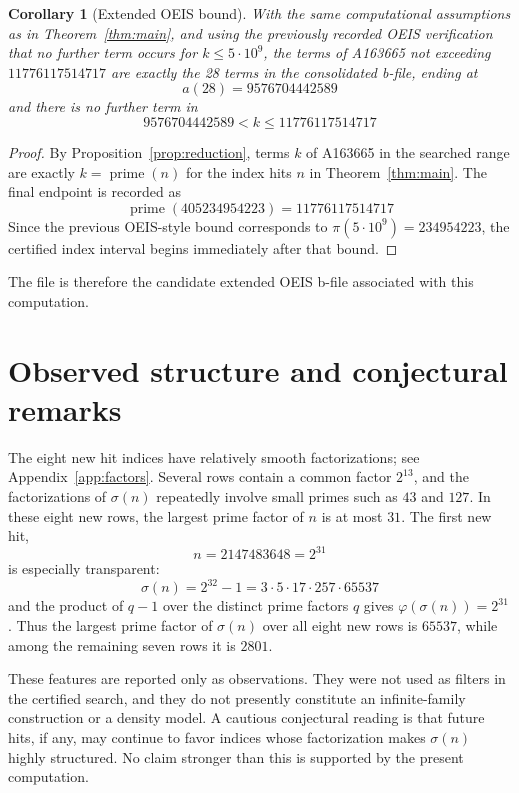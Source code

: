 \documentclass[11pt]{article}
\newtheorem{corollary}[theorem]{Corollary}
\theoremstyle{definition}
\theoremstyle{remark}
\newcommand{\seqid}{A163665}
\begin{document}
\begin{corollary}[Extended OEIS bound]
\label{cor:bound}
With the same computational assumptions as in Theorem~\ref{thm:main},
and using the previously recorded OEIS verification that no further term
occurs for \(k\leq 5\cdot 10^9\),
the terms of \seqid{} not exceeding \(11776117514717\) are exactly the
28 terms in the consolidated b-file, ending at
\[
  a(28)=9576704442589
\]
and there is no further term in
\[
  9576704442589 < k \leq 11776117514717
\]
\end{corollary}

\begin{proof}
By Proposition~\ref{prop:reduction}, terms \(k\) of \seqid{} in the
searched range are exactly \(k=\operatorname{prime}(n)\) for the index
hits \(n\) in Theorem~\ref{thm:main}.  The final endpoint is recorded as
\[
  \operatorname{prime}(405234954223)=11776117514717
\]
Since the previous OEIS-style bound corresponds to
\(\pi(5\cdot 10^9)=234954223\), the certified index interval begins
immediately after that bound.
\end{proof}

The file  is therefore the candidate extended
OEIS b-file associated with this computation.

\section{Observed structure and conjectural remarks}

The eight new hit indices have relatively smooth factorizations; see
Appendix~\ref{app:factors}.  Several rows contain a common factor
\(2^{13}\), and the factorizations of \(\sigma(n)\) repeatedly involve
small primes such as \(43\) and \(127\).  In these eight new rows, the
largest prime factor of \(n\) is at most \(31\).  The first new hit,
\[
  n=2147483648=2^{31}
\]
is especially transparent:
\[
  \sigma(n)=2^{32}-1
  =3\cdot 5\cdot 17\cdot 257\cdot 65537
\]
and the product of \(q-1\) over the distinct prime factors \(q\) gives
\(\varphi(\sigma(n))=2^{31}\).
Thus the largest prime factor of \(\sigma(n)\) over all eight new rows
is \(65537\), while among the remaining seven rows it is \(2801\).

These features are reported only as observations.  They were not used as
filters in the certified search, and they do not presently constitute an
infinite-family construction or a density model.  A cautious conjectural
reading is that future hits, if any, may continue to favor indices whose
factorization makes \(\sigma(n)\) highly structured.  No claim stronger
than this is supported by the present computation.
\end{document}
